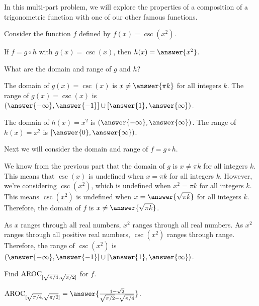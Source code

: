 \documentclass{ximera}
\author{Kenneth Berglund}
\begin{document}
\begin{exercise}
In this multi-part problem, we will explore the properties of a composition of a trigonometric function with one of our other famous functions. 

Consider the function $f$ defined by $f(x) = \csc(x^2)$. 

If $f = g \circ h$ with $g(x) = \csc(x)$, then $h(x) = \answer{x^2}$. 

\begin{exercise}
What are the domain and range of $g$ and $h$?

The domain of $g(x) = \csc(x)$ is $x \ne \answer{\pi k}$ for all integers $k$. The range of $g(x) = \csc(x)$ is $(\answer{-\infty}, \answer{-1}] \cup [\answer{1}, \answer{\infty})$. 

The domain of $h(x) = x^2$ is $(\answer{-\infty}, \answer{\infty})$. The range of $h(x) = x^2$ is $[\answer{0}, \answer{\infty})$. 


\end{exercise}
\begin{exercise}
Next we will consider the domain and range of $f = g \circ h$. 

We know from the previous part that the domain of $g$ is $x \ne \pi k$ for all integers $k$. This means that $\csc(x)$ is undefined when $x = \pi k$ for all integers $k$. However, we're considering $\csc(x^2)$, which is undefined when $x^2 = \pi k$ for all integers $k$. This means $\csc(x^2)$ is undefined when $x = \answer{\sqrt{\pi k}}$ for all integers $k$. Therefore, the domain of $f$ is $x \ne \answer{\sqrt{\pi k}}$. 

As $x$ ranges through all real numbers, $x^2$ ranges through all  real numbers. As $x^2$ ranges through all positive real numbers, $\csc(x^2)$ ranges through  range. Therefore, the range of $\csc(x^2)$ is $(\answer{-\infty}, \answer{-1}] \cup [\answer{1}, \answer{\infty})$. 

\begin{exercise}
Find $\mathrm{AROC}_{[\sqrt{\pi/4}, \sqrt{\pi/2}]}$ for $f$. 

$\av_{[\sqrt{\pi/4}, \sqrt{\pi/2}]} = \answer{\frac{1 - \sqrt{2}}{\sqrt{\pi/2} - \sqrt{\pi/4}}}$.

\end{exercise}

\end{exercise}

\end{exercise} 
 
\end{document}
